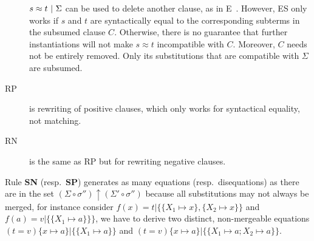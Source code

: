 \begin{description}
$ s\approx t ~|~ \Sigma $ can be used to delete another clause, as
in E~\cite{SS02}. However, ES only works if $s$ and $t$ are syntactically equal
to the corresponding subterms in the subsumed clause $C$. Otherwise, there is no
guarantee that further instantiations will not make $s\approx t$ incompatible
with $C$. Moreover, $C$ needs not be entirely removed. Only its substitutions
that are compatible with $\Sigma$ are subsumed.
\item[RP] is rewriting of positive clauses, which only works for syntactical
equality, not matching.
\item[RN] is the same as RP but for rewriting negative clauses.
\end{description}

Rule \textbf{SN} (resp.~\textbf{SP}) generates as many equations
(resp.~disequations) as there are in the set $(\Sigma \circ \sigma'')
\uparrow (\Sigma' \circ \sigma'')$ because all substitutions may not
always be merged, for instance consider $f(x) = t | \{
  \{ X_1 \mapsto x \}, \{ X_2 \mapsto x \} \}$ and $f(a) = v | \{
  \{ X_1 \mapsto a \} \} \}$, we have to derive two distinct, non-mergeable
equations
$ (t = v)\{ x \mapsto a \} | \{ \{ X_1 \mapsto a \} \}$ and
$ (t = v)\{ x \mapsto a \} | \{ \{ X_1 \mapsto a; X_2 \mapsto a \} \}$.

